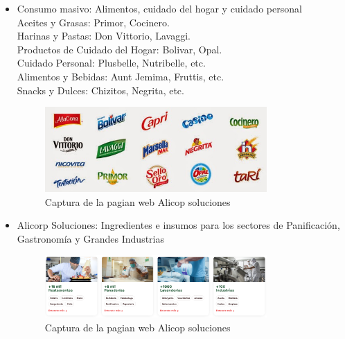 \begin{itemize}
\item Consumo masivo: Alimentos, cuidado del hogar y cuidado personal
\\Aceites y Grasas: Primor, Cocinero. 
\\Harinas y Pastas: Don Vittorio, Lavaggi. 
\\Productos de Cuidado del Hogar: Bolivar, Opal. 
\\Cuidado Personal: Plusbelle, Nutribelle, etc. 
\\Alimentos y Bebidas: Aunt Jemima, Fruttis, etc. 
\\Snacks y Dulces: Chizitos, Negrita, etc. 

\begin{figure}[!ht]
    \centering
    \includegraphics[width=0.8\textwidth]{./figuras/productos_marcas.jpg}
    \caption{Captura de la pagian web Alicop soluciones}
\label{fig:logo}
\end{figure}


\item Alicorp Soluciones: Ingredientes e insumos para los sectores de Panificación, Gastronomía y Grandes Industrias\\

\begin{figure}[!ht]
    \centering
    \includegraphics[width=0.8\textwidth]{./figuras/productos_alicorp_soluciones.png}
    \caption{Captura de la pagian web Alicop soluciones}
\label{fig:logo}
\end{figure}


\end{itemize}
